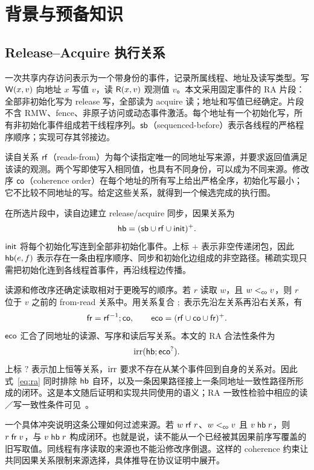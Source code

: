 \section{背景与预备知识}\label{sec:background}
\subsection{Release--Acquire 执行关系}
一次共享内存访问表示为一个带身份的事件，记录所属线程、地址及读写类型。写 $\mathsf W(x,v)$ 向地址 $x$ 写值 $v$，读 $\mathsf R(x,v)$ 观测值 $v$。本文采用固定事件的 RA 片段：全部非初始化写为 release 写，全部读为 acquire 读；地址和写值已经确定。片段不含 RMW、fence、非原子访问或动态事件激活。每个地址有一个初始化写，所有非初始化事件组成若干线程序列。$\mathsf{sb}$（sequenced-before）表示各线程的严格程序顺序；实现可存其邻接边。

读自关系 $\mathsf{rf}$（reads-from）为每个读指定唯一的同地址写来源，并要求返回值满足该读的观测。两个写即使写入相同值，也具有不同身份，可以成为不同来源。修改序 $\mathsf{co}$（coherence order）在每个地址的所有写上给出严格全序，初始化写最小；它不比较不同地址的写。给定这些关系，就得到一个候选完成的执行图。

在所选片段中，读自边建立 release/acquire 同步，因果关系为
\begin{equation}\label{eq:hb}
 \mathsf{hb}=(\mathsf{sb}\cup\mathsf{rf}\cup\mathsf{init})^+.
\end{equation}
$\mathsf{init}$ 将每个初始化写连到全部非初始化事件。上标 $+$ 表示非空传递闭包，因此 $\mathsf{hb}(e,f)$ 表示存在一条由程序顺序、同步和初始化边组成的非空路径。稀疏实现只需把初始化连到各线程首事件，再沿线程边传播。

读源和修改序还确定读取相对于更晚写的顺序。若 $r$ 读取 $w$，且 $w<_{\mathsf{co}}v$，则 $r$ 位于 $v$ 之前的 from-read 关系中。用关系复合 $;$ 表示先沿左关系再沿右关系，有
\begin{equation}\label{eq:eco}
 \mathsf{fr}=\mathsf{rf}^{-1};\mathsf{co},\qquad
 \mathsf{eco}=(\mathsf{rf}\cup\mathsf{co}\cup\mathsf{fr})^+.
\end{equation}
$\mathsf{eco}$ 汇合了同地址的读源、写序和读后写关系。本文的 RA 合法性条件为
\begin{equation}\label{eq:ra}
 \operatorname{irr}(\mathsf{hb};\mathsf{eco}^?).
\end{equation}
上标 $?$ 表示加上恒等关系，$\operatorname{irr}$ 要求不存在从某个事件回到自身的关系对。因此式~\eqref{eq:ra} 同时排除 $\mathsf{hb}$ 自环，以及一条因果路径接上一条同地址一致性路径所形成的闭环。这是本文随后证明和实现共同使用的语义；RA 一致性检验中相应的读／写一致性条件可见~\cite{tunc2023}。

一个具体冲突说明这条公理如何过滤来源。若 $w\mathrel{\mathsf{rf}} r$、$w<_{\mathsf{co}}v$ 且 $v\mathrel{\mathsf{hb}} r$，则 $r\mathrel{\mathsf{fr}} v$，与 $v\mathrel{\mathsf{hb}} r$ 构成闭环。也就是说，读不能从一个已经被其因果前序写覆盖的旧写取值。同线程有序读取的来源也不能沿修改序倒退。这样的 coherence 约束让共同因果关系限制来源选择，具体推导在协议证明中展开。

